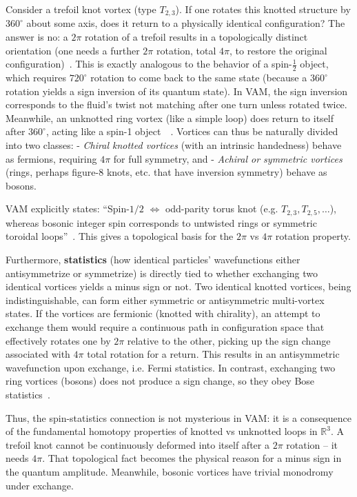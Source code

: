 \documentclass[a4paper,12pt]{article}
\begin{document}
    Consider a trefoil knot vortex (type $T_{2,3}$). If one rotates this knotted structure by $360^\circ$ about some axis, does it return to a physically identical configuration? The answer is no: a $2\pi$ rotation of a trefoil results in a topologically distinct orientation (one needs a further $2\pi$ rotation, total $4\pi$, to restore the original configuration)~\cite{reference_79}. This is exactly analogous to the behavior of a spin-$\frac{1}{2}$ object, which requires $720^\circ$ rotation to come back to the same state (because a $360^\circ$ rotation yields a sign inversion of its quantum state). In VAM, the sign inversion corresponds to the fluid's twist not matching after one turn unless rotated twice. Meanwhile, an unknotted ring vortex (like a simple loop) does return to itself after $360^\circ$, acting like a spin-1 object~\cite{reference_80}~\cite{reference_81}. Vortices can thus be naturally divided into two classes:
    - \emph{Chiral knotted vortices} (with an intrinsic handedness) behave as fermions, requiring $4\pi$ for full symmetry, and
    - \emph{Achiral or symmetric vortices} (rings, perhaps figure-8 knots, etc. that have inversion symmetry) behave as bosons.

    VAM explicitly states: “Spin-$1/2$ $\Longleftrightarrow$ odd-parity torus knot (e.g. $T_{2,3}, T_{2,5},\dots$), whereas bosonic integer spin corresponds to untwisted rings or symmetric toroidal loops”~\cite{reference_82}. This gives a topological basis for the $2\pi$ vs $4\pi$ rotation property.

    Furthermore, \textbf{statistics} (how identical particles' wavefunctions either antisymmetrize or symmetrize) is directly tied to whether exchanging two identical vortices yields a minus sign or not. Two identical knotted vortices, being indistinguishable, can form either symmetric or antisymmetric multi-vortex states. If the vortices are fermionic (knotted with chirality), an attempt to exchange them would require a continuous path in configuration space that effectively rotates one by $2\pi$ relative to the other, picking up the sign change associated with $4\pi$ total rotation for a return. This results in an antisymmetric wavefunction upon exchange, i.e. Fermi statistics. In contrast, exchanging two ring vortices (bosons) does not produce a sign change, so they obey Bose statistics~\cite{reference_83}.

    Thus, the spin-statistics connection is not mysterious in VAM: it is a consequence of the fundamental homotopy properties of knotted vs unknotted loops in $\mathbb{R}^3$. A trefoil knot cannot be continuously deformed into itself after a $2\pi$ rotation -- it needs $4\pi$. That topological fact becomes the physical reason for a minus sign in the quantum amplitude. Meanwhile, bosonic vortices have trivial monodromy under exchange.
\end{document}
